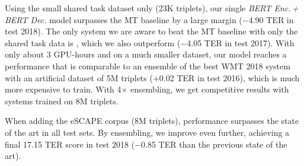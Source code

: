 Using the small shared task dataset only (23K triplets), our single
\emph{BERT Enc.\,+\,BERT Dec.} model surpasses the MT baseline by a
large margin ($-$4.90 TER in test 2018). The only system we are aware
to beat the MT baseline with only the shared task data is
\citet{berard2017lig}, which we also outperform ($-$4.05 TER in test
2017). With only about 3 GPU-hours and on a much smaller dataset, our
model reaches a performance that is comparable to an ensemble of the
best WMT 2018 system with an artificial dataset of 5M triplets
($+$0.02 TER in test 2016), which is much more expensive to train.
With 4$\times$ ensembling, we get competitive results with systems
trained on 8M triplets.

When adding the eSCAPE corpus (8M triplets), performance surpasses
the state of the art in all test sets. By ensembling, we improve even
further, achieving a final 17.15 TER score in test 2018 ($-$0.85 TER
than the previous state of the art).


